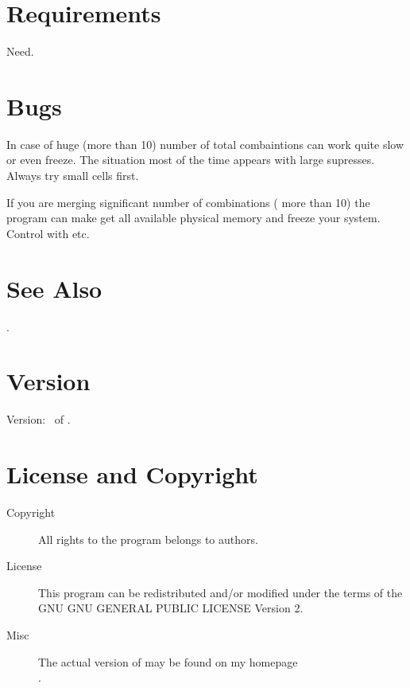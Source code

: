 \documentclass[a4paper,english]{article}
\begin{document}
\section{Requirements}

\begin{description}\setlength{\itemsep}{0cm}
\item[openbabel] Need.
\end{description}

\section{Bugs}

\begin{description}\setlength{\itemsep}{0cm}
\item In case of huge (more than 10) number of total combaintions  can work quite slow or even freeze. The situation most of the time appears with large supresses. Always try small cells first.
\item If you are merging significant number of combinations ( more than 10) the program can make get all available physical memory and freeze your system. Control  with  etc.

\end{description}

\section{See Also}

.


\section{Version}

Version: \Version\ of \Date.

\section{License and Copyright}

\begin{description}
\item[Copyright] 
     All rights to the program belongs to authors.

\item[License] This program can be redistributed and/or modified under the
     terms of the GNU GNU GENERAL PUBLIC LICENSE Version 2.

\item[Misc]
     The actual version of   may be found on my homepage\\
     .

\end{description}
\end{document}
